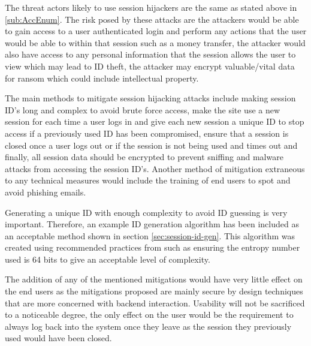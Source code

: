\documentclass{ueacmpstyle}
\begin{document}
      The threat actors likely to use session hijackers are the same as stated above 
      in \ref{sub:AccEnum}. The risk posed by these attacks are the attackers would 
      be able to gain access to a user authenticated login and perform any actions that the 
      user would be able to within that session such as a money transfer, the attacker would 
      also have access to any personal information that the session allows the user to view 
      which may lead to ID theft, the attacker may encrypt valuable/vital data for ransom 
      which could include intellectual property.

      The main methods to mitigate session hijacking attacks include making session ID's 
      long and complex to avoid brute force access, make the site use a new session for 
      each time a user logs in and give each new session a unique ID to stop access if a 
      previously used ID has been compromised, ensure that a session is closed once a user 
      logs out or if the session is not being used and times out and finally, all session 
      data should be encrypted to prevent sniffing and malware attacks from accessing the 
      session ID's. Another method of mitigation extraneous to any technical measures 
      would include the training of end users to spot and avoid phishing emails.

      Generating a unique ID with enough complexity to avoid ID guessing is very important. 
      Therefore, an example ID generation algorithm has been included as an acceptable 
      method shown in section \ref{sec:session-id-gen}. This algorithm was created using 
      recommended practices from \cite{OWASPSessionManagement} such as ensuring the entropy 
      number used is 64 bits to give an acceptable level of complexity.

      The addition of any of the mentioned mitigations would have very little effect on 
      the end users as the mitigations proposed are mainly secure by design techniques 
      that are more concerned with backend interaction. Usability will not be sacrificed 
      to a noticeable degree, the only effect on the user would be the requirement to 
      always log back into the system once they leave as the session they previously used 
      would have been closed.
\end{document}
